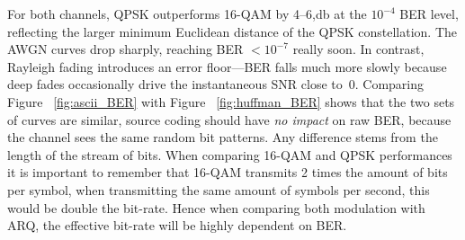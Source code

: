 For both channels, QPSK outperforms 16-QAM by 4–6,\si{\decibel} at the $10^{-4}$ BER level, reflecting the larger minimum Euclidean distance of the QPSK constellation. The AWGN curves drop sharply, reaching BER \(<10^{-7}\) really soon. In contrast, Rayleigh fading introduces an error floor—BER falls much more slowly because deep fades occasionally drive the instantaneous SNR close to~0. Comparing Figure ~\ref{fig:ascii_BER} with Figure ~\ref{fig:huffman_BER} shows that the two sets of curves are similar, source coding should have \emph{no impact} on raw BER, because the channel sees the same random bit patterns. Any difference stems from the length of the stream of bits.
When comparing 16-QAM and QPSK performances it is important to remember that 16-QAM transmits 2 times the amount of bits per symbol, when transmitting the same amount of symbols per second, this would be double the bit-rate. Hence when comparing both modulation with ARQ, the effective bit-rate will be highly dependent on BER. 

